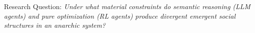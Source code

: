 Research Question:
\textit{Under what material constraints do semantic reasoning (LLM agents) and
pure optimization (RL agents) produce divergent emergent social structures in
an anarchic system?}

%
%
%
